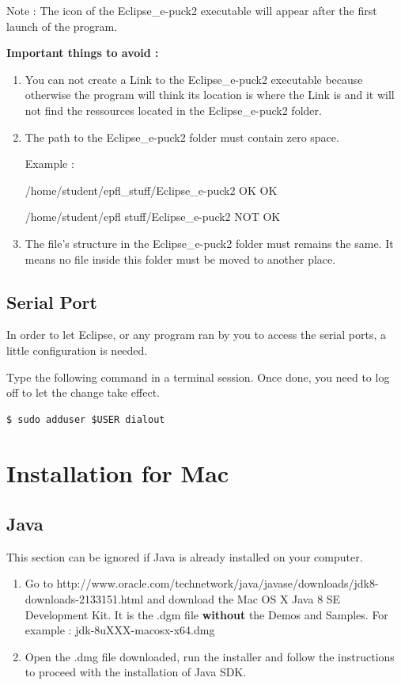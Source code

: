 \documentclass[a4paper]{article}
\begin{document}
Note : The icon of the Eclipse\_e-puck2 executable will appear after the first launch of the program.

\textbf{Important things to avoid :}

\begin{enumerate}
\item You can not create a Link to the Eclipse\_e-puck2 executable because otherwise the program will think its location is where the Link is and it will not find the ressources located in the Eclipse\_e-puck2 folder.
\item The path to the Eclipse\_e-puck2 folder must contain zero space. 

Example :

/home/student/epfl\_stuff/Eclipse\_e-puck2 OK   OK

/home/student/epfl stuff/Eclipse\_e-puck2 NOT OK

\item The file's structure in the Eclipse\_e-puck2 folder must remains the same. It means no file inside this folder must be moved to another place.
\end{enumerate}

\subsection{Serial Port}

In order to let Eclipse, or any program ran by you to access the serial ports, a little configuration is needed.

Type the following command in a terminal session. Once done, you need to log off to let the change take effect.

\begin{lstlisting}
$ sudo adduser $USER dialout
\end{lstlisting}

\newpage
\section{Installation for Mac}

\subsection{Java}
This section can be ignored if Java is already installed on your computer.

\begin{enumerate}
\item Go to http://www.oracle.com/technetwork/java/javase/downloads/jdk8-downloads-2133151.html and download the Mac OS X Java 8 SE Development Kit. It is the .dgm file \textbf{without} the Demos and Samples.
For example : jdk-8uXXX-macosx-x64.dmg
\item Open the .dmg file downloaded, run the installer and follow the instructions to proceed with the installation of Java SDK.
\end{enumerate}
\end{document}
